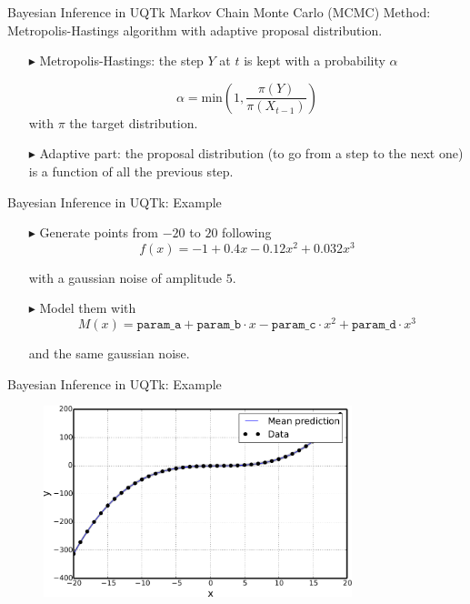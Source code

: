 \documentclass[10pt]{beamer}
\begin{document}
\begin{frame}{Bayesian Inference in UQTk}
	\large
	Markov Chain Monte Carlo (MCMC) Method: Metropolis-Hastings algorithm with
	adaptive proposal distribution. \newline
    \begin{itemize}
    	\item[$\blacktriangleright$] Metropolis-Hastings: the step $Y$ at $t$ is
    	kept with a probability $\alpha$
    	
    	$$\alpha = \text{min}(1, \frac{\pi (Y)}{\pi (X_{t-1})})$$
    	with $\pi$ the target distribution. \newline
    	
    	\item[$\blacktriangleright$] Adaptive part: the proposal distribution (to go from a step
    to the next one) is a function of all the previous step.
    \end{itemize}
\end{frame}

\begin{frame}{Bayesian Inference in UQTk: Example}
	\large
    \begin{itemize}
    	\item[$\blacktriangleright$] Generate points from $-20$ to $20$ following
    	$$f(x) = -1 + 0.4 x - 0.12 x^2 + 0.032 x^3$$
    	
    	with a gaussian noise of amplitude $5$. \newline
    	
    	\item[$\blacktriangleright$] Model them with
    	$$M(x) = \texttt{param\_a} + \texttt{param\_b} \cdot x - \texttt{param\_c}
    	\cdot x^2 + \texttt{param\_d} \cdot x^3$$
    	
    	and the same gaussian noise.
    \end{itemize}
\end{frame}

\begin{frame}{Bayesian Inference in UQTk: Example}
     \begin{figure}
         \includegraphics[width=0.8\textwidth]{result}
     \end{figure}
\end{frame}
\end{document}
